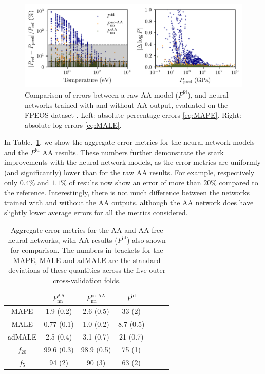 \documentclass[%
 preprint,
 superscriptaddress,
 amsmath,amssymb,
longbibliography,
]{revtex4-2}
\newcommand{\Pfd}{P^\textrm{fd}}
\newcommand{\Paa}{P_\textrm{nn}^\textrm{AA}}
\newcommand{\Pnaa}{P_\textrm{nn}^\textrm{no-AA}}
\begin{document}
\begin{figure}
    \centering
    \includegraphics{../figs/aa_nn_errs_comp.png}
    \caption{Comparison of errors between a raw AA model ($\Pfd$), and neural networks trained with and without AA output, evaluated on the FPEOS dataset \cite{Militzer_EOS_database}. Left: absolute percentage errors \eqref{eq:MAPE}. Right: absolute log errors \eqref{eq:MALE}.} 
    \label{fig:aa_nn_errs_comp}
\end{figure}

In Table.~\ref{tab:aa_CV}, we show the aggregate error metrics for the neural network models and the $\Pfd$ AA results. These numbers further demonstrate the stark improvements with the neural network models, as the error metrics are uniformly (and significantly) lower than for the raw AA results. For example, respectively only $0.4\%$ and $1.1\%$ of results now show an error of more than $20\%$ compared to the reference. Interestingly, there is not much difference between the networks trained with and without the AA outputs, although the AA network does have slightly lower average errors for all the metrics considered.

\begin{table}[]
    \centering
    \begin{tabular}{ccccccc}
        \toprule
         & $\Paa$ & $\Pnaa$ & $\Pfd$ \\ \midrule
         MAPE & 1.9 (0.2) & 2.6 (0.5) & 33 (2) \\
         MALE & 0.77 (0.1) & 1.0 (0.2) & 8.7 (0.5) \\
         adMALE & 2.5 (0.4) & 3.1 (0.7) & 21 (0.7) \\
         $f_{20}$ & 99.6 (0.3) & 98.9 (0.5) & 75 (1) \\
         $f_5$ & 94 (2) & 90 (3) & 63 (2)\\
         \bottomrule
    \end{tabular}
    \caption{Aggregate error metrics for the AA and AA-free neural networks, with AA results ($\Pfd$) also shown for comparison. The numbers in brackets for the MAPE, MALE and adMALE are the standard deviations of these quantities across the five outer cross-validation folds.}
    \label{tab:aa_CV}
\end{table}
\end{document}
